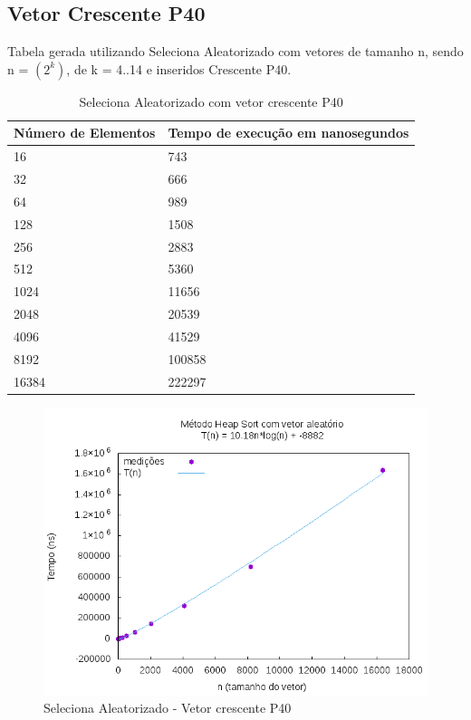 \documentclass[12pt,a4paper,twoside]{report}
\begin{document}
\subsection{Vetor Crescente P40}
Tabela gerada utilizando Seleciona Aleatorizado com vetores de tamanho n, sendo n = $(2^k)$, de k = 4..14 e inseridos Crescente P40.
\begin{table}[H]
\centering
\caption{Seleciona Aleatorizado com vetor crescente P40}
\label{my-label}
\begin{tabular}{|l|l|}
\hline
\multicolumn{1}{|c|}{\textbf{Número de Elementos}} & \multicolumn{1}{c|}{\textbf{Tempo de execução em nanosegundos}} \\ \hline
16 & 743 \\ \hline
32 & 666 \\ \hline
64 & 989 \\ \hline
128 & 1508 \\ \hline
256 & 2883 \\ \hline
512 & 5360 \\ \hline
1024 & 11656 \\ \hline
2048 & 20539 \\ \hline
4096 & 41529 \\ \hline
8192 & 100858 \\ \hline
16384 & 222297 \\ \hline

\end{tabular}
\end{table}

\begin{figure}[H]
    \centering
    \includegraphics[width=0.7\linewidth]{graficos/HeapSort/vIntAleatorio/vIntAleatorio.png}
  \caption{Seleciona Aleatorizado - Vetor crescente P40}
\end{figure}
\end{document}
